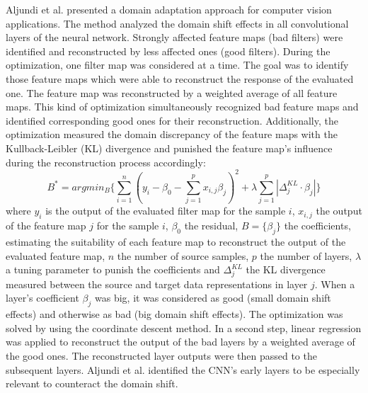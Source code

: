 Aljundi et al. \cite{Aljundi2016} presented a domain adaptation approach for computer vision applications. The method analyzed the domain shift effects in all convolutional layers of the neural network. Strongly affected feature maps (bad filters) were identified and reconstructed by less affected ones (good filters). During the optimization, one filter map was considered at a time. The goal was to identify those feature maps which were able to reconstruct the response of the evaluated one. The feature map was reconstructed by a weighted average of all feature maps. This kind of optimization simultaneously recognized bad feature maps and identified corresponding good ones for their reconstruction. Additionally, the optimization measured the domain discrepancy of the feature maps with the Kullback-Leibler (KL) divergence and punished the feature map's influence during the reconstruction process accordingly:  
\begin{equation}
    B^{*} = argmin_{B} \{ \sum_{i=1}^{n}( y_{i}-\beta_{0}-\sum_{j=1}^{p}x_{i,j}\beta_{j})^{2} + \lambda \sum_{j=1}^{p}|\Delta_{j}^{KL}\cdot \beta_{j}| \}
\end{equation}
where $y_{i}$ is the output of the evaluated filter map for the sample $i$, $x_{i,j}$ the output of the feature map $j$ for the sample $i$, $\beta_{0}$ the residual, $B = \{\beta_{j}\}$ the coefficients, estimating the suitability of each feature map to reconstruct the output of the evaluated feature map, $n$ the number of source samples, $p$ the number of layers, $\lambda$ a tuning parameter to punish the coefficients and $\Delta_{j}^{KL}$ the KL divergence measured between the source and target data representations in layer $j$. When a layer's coefficient  $\beta_{j}$ was big, it was considered as good (small domain shift effects) and otherwise as bad (big domain shift effects). The optimization was solved by using the coordinate descent method. In a second step, linear regression was applied to reconstruct the output of the bad layers by a weighted average of the good ones. The reconstructed layer outputs were then passed to the subsequent layers. Aljundi et al. \cite{Aljundi2016} identified the CNN's early layers to be especially relevant to counteract the domain shift.

